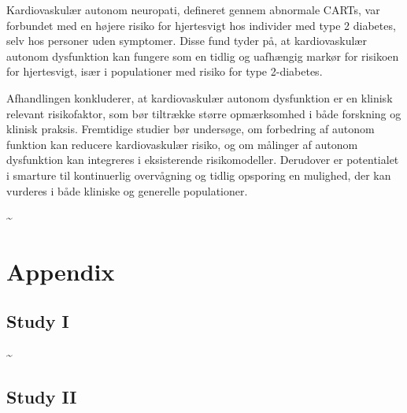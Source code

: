 \documentclass[
  a4paper,
  headsepline=true,
  open=any]{scrbook}
\begin{document}
Kardiovaskulær autonom neuropati, defineret gennem abnormale CARTs, var
forbundet med en højere risiko for hjertesvigt hos individer med type 2
diabetes, selv hos personer uden symptomer. Disse fund tyder på, at
kardiovaskulær autonom dysfunktion kan fungere som en tidlig og
uafhængig markør for risikoen for hjertesvigt, især i populationer med
risiko for type 2-diabetes.

Afhandlingen konkluderer, at kardiovaskulær autonom dysfunktion er en
klinisk relevant risikofaktor, som bør tiltrække større opmærksomhed i
både forskning og klinisk praksis. Fremtidige studier bør undersøge, om
forbedring af autonom funktion kan reducere kardiovaskulær risiko, og om
målinger af autonom dysfunktion kan integreres i eksisterende
risikomodeller. Derudover er potentialet i smarture til kontinuerlig
overvågning og tidlig opsporing en mulighed, der kan vurderes i både
kliniske og generelle populationer.

\newpage

\thispagestyle{empty}

\textasciitilde{} \newpage

\cleardoublepage
{}
{}
\appendix

\hypertarget{sec-more-results}{%
\chapter{Appendix}\label{sec-more-results}}

\hypertarget{study-i-1}{%
\section{Study I}\label{study-i-1}}

\newpage

\thispagestyle{empty}

\textasciitilde{} \newpage






\newpage
\restoregeometry

\hypertarget{study-ii-1}{%
\section{Study II}\label{study-ii-1}}
\end{document}
